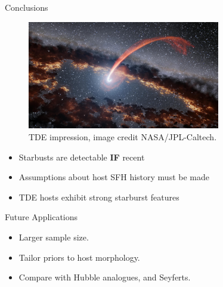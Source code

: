 \documentclass{beamer}
\begin{document}
\begin{frame}{Conclusions}
  \begin{figure}
    \includegraphics[width=0.75\textwidth]{tidal_disruption_event}
    \caption{TDE impression, image credit NASA/JPL-Caltech.}
    \label{img:tde_impression}
  \end{figure}
  \begin{itemize}
    \item Starbusts are detectable \textbf{IF} recent %
    \item Assumptions about host SFH history must be made
    \item TDE hosts exhibit strong starburst features
  \end{itemize}
\end{frame}

\begin{frame}{Future Applications}
  \begin{itemize}
    \item Larger sample size.
    \item Tailor priors to host morphology.
    \item Compare with Hubble analogues, and Seyferts.
  \end{itemize}
\end{frame}

\end{document}
